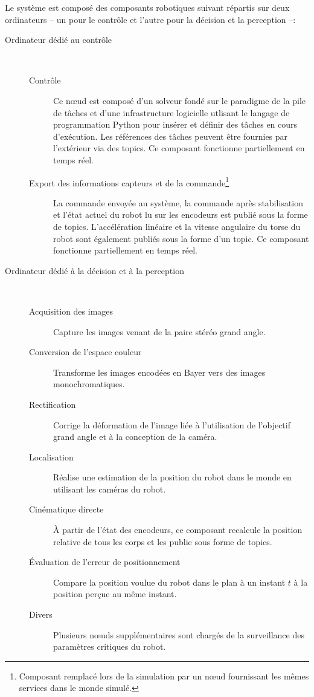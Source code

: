 Le système est composé des composants robotiques suivant répartis sur
deux ordinateurs -- un pour le contrôle et l'autre pour la décision et
la perception --:
\begin{description}
\item[Ordinateur dédié au contrôle]
   \\
  \begin{description}
  \item[Contrôle] Ce n\oe ud est composé d'un solveur fondé sur le
    paradigme de la pile de tâches et d'une infrastructure logicielle
    utlisant le langage de programmation Python pour insérer et
    définir des tâches en cours d'exécution. Les références des tâches
    peuvent être fournies par l'extérieur via des topics. Ce composant
    fonctionne partiellement en temps réel.
  \item[Export des informations capteurs et de la
    commande\footnote{Composant remplacé lors de la simulation par un
      n\oe ud fournissant les mêmes services dans le monde
      simulé.}\addtocounter{footnote}{-1}\addtocounter{Hfootnote}{-1}]
    La commande envoyée au système, la commande après stabilisation et
    l'état actuel du robot lu sur les encodeurs est publié sous la
    forme de topics. L'accélération linéaire et la vitesse angulaire
    du torse du robot sont également publiés sous la forme d'un
    topic. Ce composant fonctionne partiellement en temps réel.
  \end{description}

\item[Ordinateur dédié à la décision et à la perception]
   \\
  \begin{description}
  \item[Acquisition des images\footnotemark] Capture les images venant de la paire
    stéréo grand angle.
  \item[Conversion de l'espace couleur] Transforme les images encodées
    en Bayer vers des images monochromatiques.
  \item[Rectification] Corrige la déformation de l'image liée à
    l'utilisation de l'objectif grand angle et à la conception de la
    caméra.
  \item[Localisation] Réalise une estimation de la position du robot
    dans le monde en utilisant les caméras du robot.
  \item[Cinématique directe] À partir de l'état des encodeurs, ce
    composant recalcule la position relative de tous les corps et les
    publie sous forme de topics.
  \item[Évaluation de l'erreur de positionnement] Compare la position
    voulue du robot dans le plan à un instant $t$ à la position perçue
    au même instant.
  \item[Divers] Plusieurs n\oe uds supplémentaires sont chargés de la
    surveillance des paramètres critiques du robot.
  \end{description}
\end{description}


